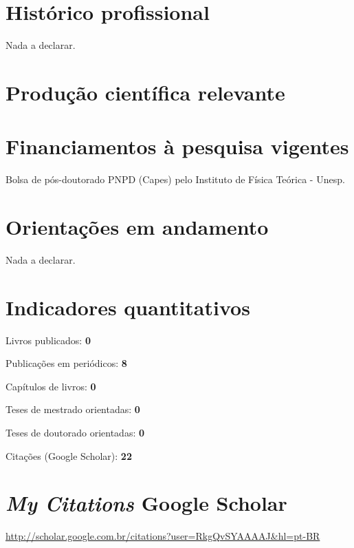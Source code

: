 \documentclass[a4paper ,11pt]{article}
\renewenvironment{enumerate}{
  \begin{list}{}{
    \setlength{\leftmargin}{2em}
  }
}{
  \end{list}
}
\begin{document}
\section{Histórico profissional}
Nada a declarar.

\section{Produção científica relevante}

\renewcommand{\refname}{Artigos}

\nocite{*}



\section{Financiamentos à pesquisa vigentes}
Bolsa de pós-doutorado PNPD (Capes) pelo Instituto de Física Teórica - Unesp.

\section{Orientações em andamento}
Nada a declarar.

\section{Indicadores quantitativos}
\begin{enumerate}
    \item Livros publicados: \textbf{0}
    \item Publicações em periódicos: \textbf{8}
    \item Capítulos de livros: \textbf{0}
    \item Teses de mestrado orientadas: \textbf{0}
    \item Teses de doutorado orientadas: \textbf{0}
    \item Citações (Google Scholar): \textbf{22}
\end{enumerate}

\section{\emph{My Citations} Google Scholar}
\url{http://scholar.google.com.br/citations?user=RkgQvSYAAAAJ&hl=pt-BR}
\end{document}
